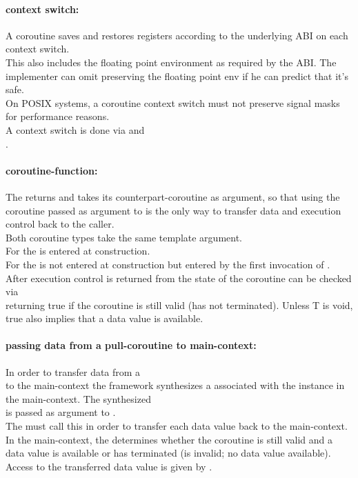 \paragraph*{context switch:}
A coroutine saves and restores registers according to the underlying ABI on
each context switch.\\
\newline
This also includes the floating point environment as required by the ABI. The
implementer can omit preserving the floating point env if he can predict that
it's safe.\\
\newline
On POSIX systems, a coroutine context switch must not preserve signal masks for performance
reasons.\\
\newline
A context switch is done via \pushcoroop and\\
\pullcoroop.

\paragraph*{coroutine-function:}
The \corofunction returns  and takes its counterpart-coroutine as
argument, so that using the coroutine passed as argument to \corofunction is the
only way to transfer data and execution control back to the caller.\\
Both coroutine types take the same template argument.\\
For \pullcoro the \corofunction is entered at \pullcoro construction.\\
For \pushcoro the \corofunction is not entered at \pushcoro construction but
entered by the first invocation of \pushcoroop.\\
After execution control is returned from \corofunction the state of the
coroutine can be checked via\\
\pullcorobool returning true if the coroutine is still valid (\corofunction has
not terminated). Unless T is void, true also implies that a data value is
available.

\paragraph*{passing data from a pull-coroutine to main-context:}
In order to transfer data from a\\
\pullcoro to the main-context the framework synthesizes a \pushcoro associated
with the \pullcoro instance in the main-context. The synthesized\\
\pushcoro is passed as argument to \corofunction.\\
The \corofunction must call this \pushcoroop in order to transfer each
data value back to the main-context.\\
In the main-context, the \pullcorobool determines whether the coroutine is still valid and
a data value is available or \corofunction has terminated (\pullcoro is invalid;
no data value available). Access to the transferred data value is given by
\pullcoroget.

